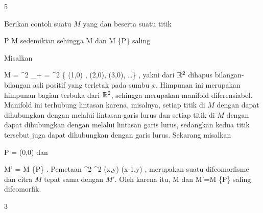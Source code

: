 {5}

{

Berikan contoh suatu
$M$ yang
dan
beserta suatu titik

\mavergleichskette
{\vergleichskette
{ P
}
{ \in }{ M
}
{  }{
}
{    }{
}
{   }{
}
}
{}{}{}
sedemikian sehingga
\mathkor {} {M} {dan} {M \setminus \{P\}} {}
saling

}
{

Misalkan

\mavergleichskettedisp
{\vergleichskette
{M
}
{ =} { \R^2 \setminus \N_+
}
{ =} { \R^2 \setminus \{ (1,0) , (2,0), (3,0), \ldots  \}
}
{ } {
}
{ } {
}
}
{}{}{,}
yakni dari ${\mathbb R}^2$ dihapus bilangan-bilangan asli positif yang terletak pada sumbu $x$. Himpunan ini merupakan himpunan bagian terbuka dari ${\mathbb R}^2$, sehingga merupakan manifold diferensiabel. Manifold ini terhubung lintasan karena, misalnya, setiap titik di $M$ dengan
 dapat dihubungkan dengan
 melalui lintasan garis lurus dan setiap titik di $M$ dengan
 dapat dihubungkan dengan
 melalui lintasan garis lurus, sedangkan kedua titik tersebut juga dapat dihubungkan dengan garis lurus. Sekarang misalkan

\mavergleichskettedisp
{\vergleichskette
{P
}
{ =} { (0,0)
}
{ } {
}
{ } {
}
{ } {
}
}
{}{}{}
dan

\mavergleichskettedisp
{\vergleichskette
{M'
}
{ =} { M \setminus \{P\}
}
{ } {
}
{ } {
}
{ } {
}
}
{}{}{.}
Pemetaan
\maabbeledisp {} {\R^2} {\R^2
} {(x,y)} {(x-1,y)
} {,}
merupakan suatu difeomorfisme
 {} {}
dan citra $M$ tepat sama dengan $M'$. Oleh karena itu,
\mathkor {} {M} {dan} {M'=M \setminus \{P\}} {}
saling difeomorfik.

 }



{3}

